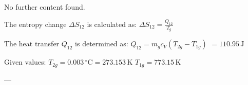 No further content found.

The entropy change \( \Delta S_{12} \) is calculated as:  
\( \Delta S_{12} = \frac{Q_{12}}{T_{g}} \)  

The heat transfer \( Q_{12} \) is determined as:  
\( Q_{12} = m_g c_V (T_{2g} - T_{1g}) \)  
\( = 110.95 \, \text{J} \)  

Given values:  
\( T_{2g} = 0.003 \, ^\circ \text{C} = 273.153 \, \text{K} \)  
\( T_{1g} = 773.15 \, \text{K} \)  

---